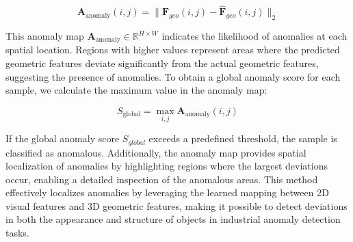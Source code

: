 \begin{equation}
\mathbf{A}_{\text{anomaly}}(i, j) = \|\mathbf{F}_{geo}(i, j) - \hat{\mathbf{F}}_{geo}(i, j)\|_2
\end{equation}

\noindent This anomaly map $\mathbf{A}_{\text{anomaly}} \in \mathbb{R}^{H \times W}$ indicates the likelihood of anomalies at each spatial location. Regions with higher values represent areas where the predicted geometric features deviate significantly from the actual geometric features, suggesting the presence of anomalies. To obtain a global anomaly score for each sample, we calculate the maximum value in the anomaly map:

\begin{equation}
S_{\text{global}} = \max_{i,j} \mathbf{A}_{\text{anomaly}}(i, j)
\end{equation}

\noindent If the global anomaly score $S_{global}$ exceeds a predefined threshold, the sample is classified as anomalous. Additionally, the anomaly map provides spatial localization of anomalies by highlighting regions where the largest deviations occur, enabling a detailed inspection of the anomalous areas. This method effectively localizes anomalies by leveraging the learned mapping between 2D visual features and 3D geometric features, making it possible to detect deviations in both the appearance and structure of objects in industrial anomaly detection tasks.
